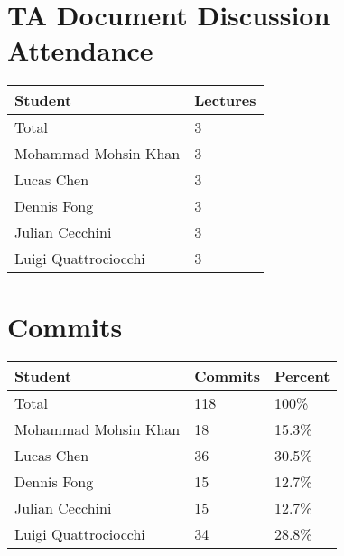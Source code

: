 \documentclass{article}
\begin{document}
\section{TA Document Discussion Attendance}

\begin{table}[H]
\centering
\begin{tabular}{ll}
\toprule
\textbf{Student} & \textbf{Lectures}\\
\midrule
Total & 3\\
Mohammad Mohsin Khan & 3\\
Lucas Chen & 3\\
Dennis Fong & 3\\
Julian Cecchini & 3\\
Luigi Quattrociocchi & 3\\
\bottomrule
\end{tabular}
\end{table}

\section{Commits}


\begin{table}[H]
\centering
\begin{tabular}{lll}
\toprule
\textbf{Student} & \textbf{Commits} & \textbf{Percent}\\
\midrule
Total & 118 & 100\% \\
Mohammad Mohsin Khan & 18 & 15.3\% \\
Lucas Chen & 36 & 30.5\% \\
Dennis Fong & 15 & 12.7\% \\
Julian Cecchini & 15 & 12.7\% \\
Luigi Quattrociocchi & 34 & 28.8\% \\
\bottomrule
\end{tabular}
\end{table}

\end{document}
